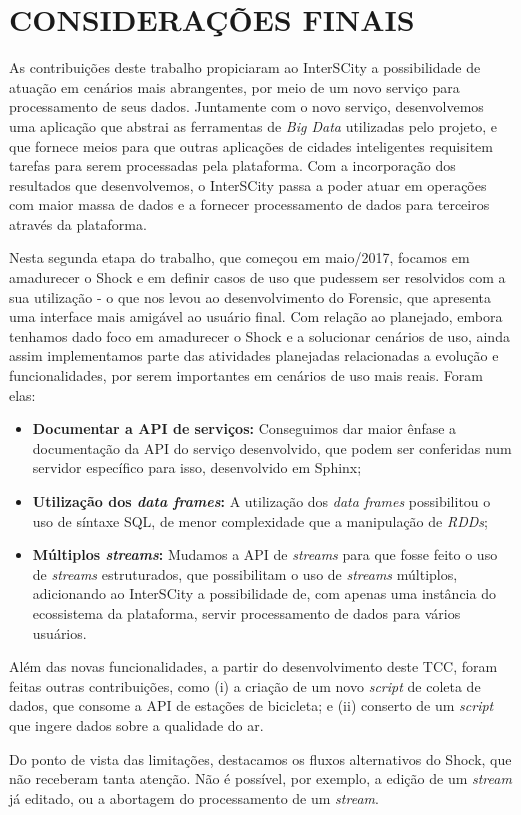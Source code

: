 \chapter{CONSIDERAÇÕES FINAIS}
\label{chapter:final}

As contribuições deste trabalho propiciaram ao InterSCity a possibilidade de
atuação em cenários mais abrangentes, por meio de um novo serviço
para processamento de seus dados. Juntamente com o novo serviço, desenvolvemos
uma aplicação que abstrai as ferramentas de \textit{Big Data} utilizadas pelo
projeto, e que fornece meios para que outras aplicações de cidades inteligentes
requisitem tarefas para serem processadas pela plataforma. Com a incorporação
dos resultados que desenvolvemos, o InterSCity passa a poder atuar em
operações com maior massa de dados e a fornecer processamento de dados para
terceiros através da plataforma.

Nesta segunda etapa do trabalho, que começou em maio/2017, focamos em
amadurecer o Shock e em definir casos de uso que pudessem ser resolvidos com
a sua utilização - o que nos levou ao desenvolvimento do Forensic, que apresenta
uma interface mais amigável ao usuário final. Com relação ao planejado, embora
tenhamos dado foco em amadurecer o Shock e a solucionar cenários de uso, ainda
assim implementamos parte das atividades planejadas relacionadas a evolução e
funcionalidades, por serem importantes em cenários de uso mais reais. Foram
elas:

\begin{itemize}
    \item \textbf{Documentar a API de serviços:} Conseguimos dar maior ênfase a
        documentação da API do serviço desenvolvido, que podem ser conferidas
        num servidor específico para isso, desenvolvido em Sphinx;
    \item \textbf{Utilização dos \textit{data frames}:} A utilização dos
        \textit{data frames} possibilitou o uso de síntaxe SQL, de menor
        complexidade que a manipulação de \textit{RDDs};
    \item \textbf{Múltiplos \textit{streams}:} Mudamos a API de \textit{streams}
        para que fosse feito o uso de \textit{streams} estruturados, que
        possibilitam o uso de \textit{streams} múltiplos, adicionando ao
        InterSCity a possibilidade de, com apenas uma instância do ecossistema
        da plataforma, servir processamento de dados para vários usuários.
\end{itemize}

Além das novas funcionalidades, a partir do desenvolvimento deste TCC, foram
feitas outras contribuições, como (i) a criação de um novo \textit{script} de
coleta de dados, que consome a API de estações de bicicleta; e (ii) conserto
de um \textit{script} que ingere dados sobre a qualidade do ar.

Do ponto de vista das limitações, destacamos os fluxos alternativos do Shock,
que não receberam tanta atenção. Não é possível, por exemplo, a edição de um
\textit{stream} já editado, ou a abortagem do processamento de um
\textit{stream}. 
